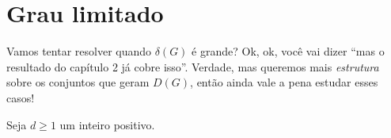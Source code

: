 \chapter{Grau limitado}
\label{cap:grau-limitado}


\newcommand{\drawAndrasfai}[1]{%
  \def\d{#1}                              %
  \pgfmathsetmacro\n{int(3*\d - 1)}       %
  \begin{tikzpicture}[scale=1.5,
    every node/.style={circle, draw, fill=white, inner sep=1pt, font=\small}]
  
  \foreach \i in {0,...,\numexpr \n-1 \relax} {
    \pgfmathsetmacro\angle{90-360*\i/\n}
    \node (v\i) at (\angle:1) {\i};       %
  }

  \foreach \i in {0,...,\numexpr \n-1 \relax} {
    \foreach \offset in {0,...,\numexpr \d-1 \relax} {
      \pgfmathsetmacro\j{mod(\i + \d + \offset, \n)} %
      \pgfmathtruncatemacro{\ii}{\i}
      \pgfmathtruncatemacro{\jj}{\j}
      \ifnum\ii<\jj
        \draw (v\ii) -- (v\jj);          %
      \fi
    }
  }

  \end{tikzpicture}
}


Vamos tentar resolver quando $\delta(G)$ é grande?
Ok, ok, você vai dizer ``mas o resultado do capítulo 2 já cobre isso''.
Verdade, mas queremos mais \textit{estrutura} sobre os conjuntos que geram $D(G)$, então ainda vale a pena estudar esses casos!

Seja $d \geq 1$ um inteiro positivo.

